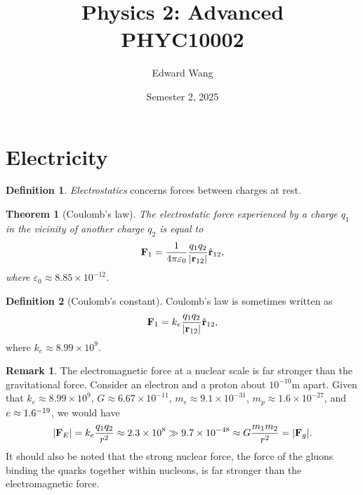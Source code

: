 \documentclass[a4paper]{scrartcl}
\newtheorem{theorem}{Theorem}
\theoremstyle{definition}
\newtheorem{definition}{Definition}
\newtheorem{remark}{Remark}
\DeclarePairedDelimiter\abs{\lvert}{\rvert}
\let\epsilon\varepsilon
\let\vec\mathbf
\begin{document}
\title{Physics 2: Advanced \\ PHYC10002}
\author{Edward Wang}
\date{Semester 2, 2025}
\maketitle

\tableofcontents

\section{Electricity}
\begin{definition}
  \emph{Electrostatics} concerns forces between charges at rest.
\end{definition}
\begin{theorem}[Coulomb's law]
  The electrostatic force experienced by a charge $q_1$ in the vicinity of another charge $q_2$ is equal to \[
    \vec{F}_{1} = \frac{1}{4\pi \epsilon_0} \frac{q_1q_2}{\abs{\vec{r}_{12}}}\hat{\vec{r}}_{12},
  \] 
  where $\epsilon_0 \approx 8.85\times 10^{-12}$.
\end{theorem}
\begin{definition}[Coulomb's constant]
  Coulomb's law is sometimes written as \[
    \vec{F}_{1} = k_e\frac{q_1q_2}{\abs{\vec{r}_{12}}}\hat{\vec{r}}_{12},
  \] 
  where $k_e \approx 8.99 \times 10^{9}$.
\end{definition}
\begin{remark}
  The electromagnetic force at a nuclear scale is far stronger than the gravitational force. Consider an electron and a proton about $10^{-10}$m apart. Given that $k_e\approx 8.99\times 10^{9}$, $G\approx 6.67\times 10^{-11}$, $m_e \approx 9.1\times 10^{-31}$, $m_p \approx 1.6\times 10^{-27}$, and $e \approx 1.6\time 10^{-19}$, we would have  \[
    \abs{\vec{F}_E} = k_e\frac{q_1q_2}{r^2} \approx 2.3 \times 10^{8} \gg 9.7 \times 10^{-48} \approx G \frac{m_1m_2}{r^2} = \abs{\vec{F}_g}.
  \] 
  It should also be noted that the strong nuclear force, the force of the gluons binding the quarks together within nucleons, is far stronger than the electromagnetic force.
\end{remark}
\end{document}
